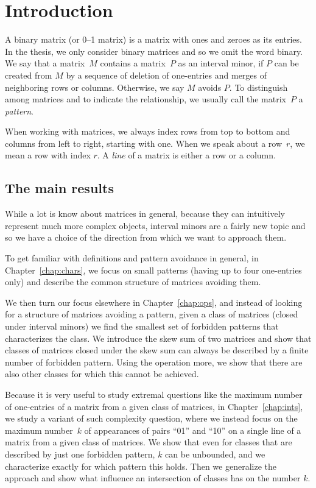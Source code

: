 \chapter{Introduction}
A binary matrix (or 0--1 matrix) is a matrix with ones and zeroes as its entries. In the thesis, we only consider binary matrices and so we omit the word binary. We say that a matrix~$M$ contains a matrix~$P$ as an interval minor, if $P$ can be created from $M$ by a sequence of deletion of one-entries and merges of neighboring rows or columns. Otherwise, we say $M$ avoids $P$. To distinguish among matrices and to indicate the relationship, we usually call the matrix~$P$ a \emph{pattern}.

When working with matrices, we always index rows from top to bottom and columns from left to right, starting with one. When we speak about a row~$r$, we mean a row with index $r$. A \emph{line} of a matrix is either a row or a column.

\section{The main results}
While a lot is know about matrices in general, because they can intuitively represent much more complex objects, interval minors are a fairly new topic and so we have a choice of the direction from which we want to approach them.

To get familiar with definitions and pattern avoidance in general, in Chapter~\ref{chap:chars}, we focus on small patterns (having up to four one-entries only) and describe the common structure of matrices avoiding them.

We then turn our focus elsewhere in Chapter~\ref{chap:ops}, and instead of looking for a structure of matrices avoiding a pattern, given a class of matrices (closed under interval minors) we find the smallest set of forbidden patterns that characterizes the class. We introduce the skew sum of two matrices and show that classes of matrices closed under the skew sum can always be described by a finite number of forbidden pattern. Using the operation more, we show that there are also other classes for which this cannot be achieved.

Because it is very useful to study extremal questions like the maximum number of one-entries of a matrix from a given class of matrices, in Chapter~\ref{chap:ints}, we study a variant of such complexity question, where we instead focus on the maximum number~$k$ of appearances of pairs ``01'' and ``10'' on a single line of a matrix from a given class of matrices. We show that even for classes that are described by just one forbidden pattern, $k$ can be unbounded, and we characterize exactly for which pattern this holds. Then we generalize the approach and show what influence an intersection of classes has on the number $k$.

